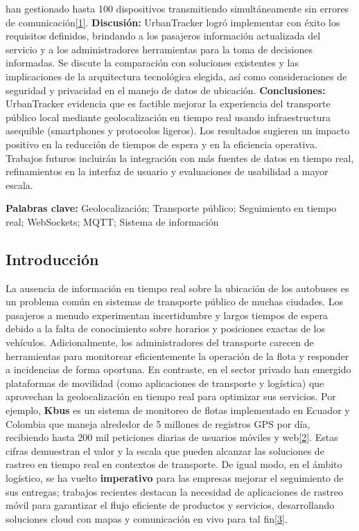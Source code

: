 \documentclass[
]{article}
\begin{document}
han gestionado hasta 100 dispositivos transmitiendo simultáneamente sin
errores de
comunicación\href{https://fliphtml5.com/lqsof/cdpg/Art\%C3\%ADculos/\#:~:text=permitiendo\%20un\%20flujo\%20de\%20datos,del\%20sistema\%20fue\%20un\%20rigurosa}{{[}1{]}}.
\textbf{Discusión:} UrbanTracker logró implementar con éxito los
requisitos definidos, brindando a los pasajeros información actualizada
del servicio y a los administradores herramientas para la toma de
decisiones informadas. Se discute la comparación con soluciones
existentes y las implicaciones de la arquitectura tecnológica elegida,
así como consideraciones de seguridad y privacidad en el manejo de datos
de ubicación. \textbf{Conclusiones:} UrbanTracker evidencia que es
factible mejorar la experiencia del transporte público local mediante
geolocalización en tiempo real usando infraestructura asequible
(smartphones y protocolos ligeros). Los resultados sugieren un impacto
positivo en la reducción de tiempos de espera y en la eficiencia
operativa. Trabajos futuros incluirán la integración con más fuentes de
datos en tiempo real, refinamientos en la interfaz de usuario y
evaluaciones de usabilidad a mayor escala.

\textbf{Palabras clave:} Geolocalización; Transporte público;
Seguimiento en tiempo real; WebSockets; MQTT; Sistema de información

\subsection{Introducción}\label{introducciuxf3n}

La ausencia de información en tiempo real sobre la ubicación de los
autobuses es un problema común en sistemas de transporte público de
muchas ciudades. Los pasajeros a menudo experimentan incertidumbre y
largos tiempos de espera debido a la falta de conocimiento sobre
horarios y posiciones exactas de los vehículos. Adicionalmente, los
administradores del transporte carecen de herramientas para monitorear
eficientemente la operación de la flota y responder a incidencias de
forma oportuna. En contraste, en el sector privado han emergido
plataformas de movilidad (como aplicaciones de transporte y logística)
que aprovechan la geolocalización en tiempo real para optimizar sus
servicios. Por ejemplo, \textbf{Kbus} es un sistema de monitoreo de
flotas implementado en Ecuador y Colombia que maneja alrededor de 5
millones de registros GPS por día, recibiendo hasta 200 mil peticiones
diarias de usuarios móviles y
web\href{https://dialnet.unirioja.es/servlet/articulo?codigo=7425696\#:~:text=,monolito\%20previo\%20se\%20encontraba\%20en}{{[}2{]}}.
Estas cifras demuestran el valor y la escala que pueden alcanzar las
soluciones de rastreo en tiempo real en contextos de transporte. De
igual modo, en el ámbito logístico, se ha vuelto \textbf{imperativo}
para las empresas mejorar el seguimiento de sus entregas; trabajos
recientes destacan la necesidad de aplicaciones de rastreo móvil para
garantizar el flujo eficiente de productos y servicios, desarrollando
soluciones cloud con mapas y comunicación en vivo para tal
fin\href{https://trid.trb.org/View/2571597\#:~:text=efficiency\%20for\%20product\%20delivery,for\%20server\%20setup\%2C\%20Docker\%2C\%20and}{{[}3{]}}.
\end{document}
